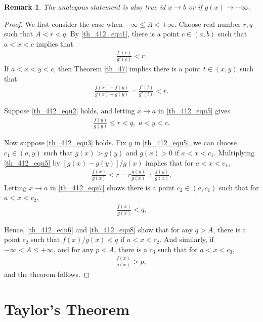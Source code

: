 \documentclass[10pt]{book}
\newtheorem{remark}{Remark}[chapter]
\theoremstyle{definition}
\numberwithin{equation}{chapter}
\begin{document}
\begin{remark}
The analogous statement is also true id $x \to b$ or if $g(x) \to -\infty$.
\end{remark}

\begin{proof}
We first consider the case when $- \infty \leq A < +\infty$. Choose real number $r, q$ such that $A < r < q$. By \eqref{th_412_equ1}, there is a point $c \in (a,b)$ such that $a < x < c$ implies that 
\begin{align*}
    \frac{f'(c)}{g'(c)} < r.
\end{align*}
If $a < x < y < c$, then Theorem \ref{th_47} implies there is a point $t \in (x,y)$ such that \begin{align}\label{th_412_equ5}
    \frac{f(x) - f(y)}{g(x) - g(y)} = \frac{f'(t)}{g'(t)} < r.
\end{align}

Suppose \eqref{th_412_equ2} holds, and letting $x \to a$ in \eqref{th_412_equ5} gives
\begin{align}\label{th_412_equ6}
    \frac{f(y)}{g(y)} \leq r < q,  \,\, a < y < c.
\end{align}

Now suppose \eqref{th_412_equ3} holds. Fix $y$ in \eqref{th_412_equ5}, we can choose $c_1 \in (a,y)$ such that $g(x) > g(y)$ and $g(x) > 0$ if $a < x < c_1$. Multiplying \eqref{th_412_equ5} by $[g(x) - g(y)]/g(x)$ implies that for $a < x < c_1$,
\begin{align}\label{th_412_equ7}
    \frac{f(x)}{g(x)} < r - r \frac{g(y)}{g(x)} + \frac{f(y)}{g(x)}.
\end{align}
Letting $x \to a$ in \eqref{th_412_equ7} shows there is a point $c_2 \in (a,c_1)$ such that for $a < x < c_2$,
\begin{align}\label{th_412_equ8}
    \frac{f(x)}{g(x)} < q.
\end{align}

Hence, \eqref{th_412_equ6} and \eqref{th_412_equ8} show that for any $q > A$, there is a point $c_2$ such that $f(x)/g(x) < q$ if $a < x < c_2$. And similarly, if $-\infty < A \leq + \infty$, and for any $p < A$, there is a $c_3$ such that for $a < x < c_3$,
\begin{align*}
    \frac{f(x)}{g(x)} > p,
\end{align*}
and the theorem follows.
\end{proof}

\medskip


\section{Taylor's Theorem}
\end{document}
